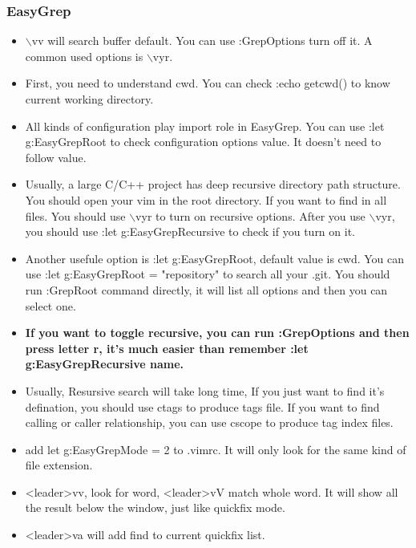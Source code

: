 \documentclass[a4paper,12pt,twoside]{book}
\begin{document}
\subsubsection{EasyGrep}
\begin{itemize}
        \item $\backslash$vv will search buffer default. You can use :GrepOptions turn off it. A common used options is $\backslash$vyr.

		\item First, you need to understand cwd. You can check :echo getcwd() to know current working directory. 

		\item All kinds of configuration play import role in EasyGrep. You can use :let g:EasyGrepRoot to check configuration options value. It doesn't need to follow value.

		\item Usually, a large C/C++ project has deep recursive directory path structure. You should open your vim in the root directory. If you want to find in all files. You should use $\backslash$vyr to turn on recursive options. After you use $\backslash$vyr, you should use :let g:EasyGrepRecursive to check if you turn on it.

		\item Another usefule option is :let g:EasyGrepRoot, default value is cwd. You can use :let g:EasyGrepRoot = "repository" to search all your .git.  You should run :GrepRoot command directly, it will list all options and then you can select one.

		\item \textbf{If you want to toggle recursive, you can run :GrepOptions and then press letter r, it's much easier than remember :let g:EasyGrepRecursive name.} 

		\item Usually, Resursive search will take long time, If you just want to find it's defination, you should use ctags to produce tags file. If you want to find calling or caller relationship, you can use cscope to produce tag index files. 

		\item add let g:EasyGrepMode = 2 to .vimrc. It will only look for the same kind of file extension. 

		\item <leader>vv, look for word,  <leader>vV match whole word. It will show all the result below the window, just like quickfix mode.
 
				
		\item <leader>va will add find to current quickfix list. 


\end{itemize}
\end{document}
